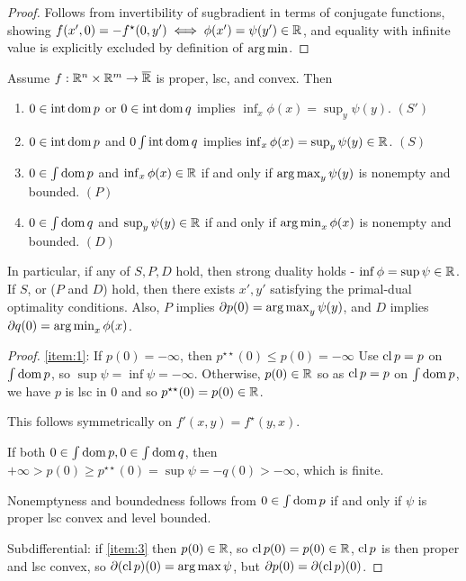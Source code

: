 \begin{proof}
  Follows from invertibility of sugbradient in terms of conjugate
  functions, showing $f(x', 0) = -f^{\star}(0, y') \iff \phi(x') =
  \psi(y') \in \mathbb{R}$, and equality with infinite value is explicitly
  excluded by definition of $\operatorname*{arg\,min}$.
\end{proof}

\begin{thm}
  \label{sec:duality-optimization-6}
  Assume $f: \mathbb{R}^{n} \times \mathbb{R}^{m} \rightarrow \overline {\mathbb{R}}$ is proper,
  lsc, and convex. Then
  \begin{enumerate}
  \item\label{item:1} $0 \in \operatorname*{int} \operatorname*{dom} p$ or $0 \in \operatorname*{int} \operatorname*{dom} q$ implies
    $\inf_{x} \phi(x) = \sup_{y} \psi(y)$. $(S')$
  \item\label{item:2} $0 \in \operatorname*{int} \operatorname*{dom} p$ and $0 \int \operatorname*{int} \operatorname*{dom} q$ implies
    $\inf_{x} \phi(x) = \sup_{y} \psi(y) \in \mathbb{R}$. $(S)$
  \item\label{item:3} $0 \in \int \operatorname*{dom} p$ and $\inf_{x} \phi(x) \in \mathbb{R}$ if and only
    if $\operatorname*{arg\,max}_{y} \psi(y)$ is nonempty and bounded. $(P)$
  \item\label{item:4} $0 \in \int \operatorname*{dom} q$ and $\sup_{y} \psi(y) \in \mathbb{R}$ if and only
    if $\operatorname*{arg\,min}_{x} \phi(x)$ is nonempty and bounded. $(D)$
  \end{enumerate}
  In particular, if any of $S, P, D$ hold, then strong duality holds -
  $\inf \phi = \sup \psi \in \mathbb{R}$. If $S$, or ($P$ and $D$) hold, then
  there exists $x', y'$ satisfying the primal-dual optimality
  conditions. Also, $P$ implies $\partial p(0) = \operatorname*{arg\,max}_{y}
  \psi(y)$, and $D$ implies $\partial q(0) = \operatorname*{arg\,min}_{x}
  \phi(x)$.
\end{thm}

\begin{proof}
  \ref{item:1}: If $p(0) = -\infty$, then $p^{\star \star}(0) \leq
  p(0) = -\infty$ Use $\operatorname*{cl} p = p$ on $\int \operatorname*{dom} p$, so $\sup \psi =
  \inf \psi = -\infty$.  Otherwise, $p(0) \in \mathbb{R}$ so as $\operatorname*{cl} p = p$ on
  $\int \operatorname*{dom} p$, we have $p$ is lsc in 0 and so $p^{\star \star}(0) =
  p(0) \in \mathbb{R}$.

  This follows symmetrically on $f'(x, y) = f^{\star}(y, x)$.

  If both $0 \in \int \operatorname*{dom} p,  0 \in \int \operatorname*{dom} q$, then $+\infty >
  p(0) \geq p^{\star \star}(0) = \sup \psi = -q(0) > -\infty$, which
  is finite.

  Nonemptyness and boundedness follows from $0 \in \int \operatorname*{dom} p$ if and
  only if $\psi $ is proper lsc convex and level bounded.

  Subdifferential: if \ref{item:3} then $p(0) \in \mathbb{R}$, so $\operatorname*{cl} p(0) =
  p(0) \in \mathbb{R}$, $\operatorname*{cl} p$ is then proper and lsc convex, so $\partial
  (\operatorname*{cl} p)(0) = \arg \max \psi$, but $\partial p(0) = \partial (\operatorname*{cl}
  p)(0)$.
\end{proof}

